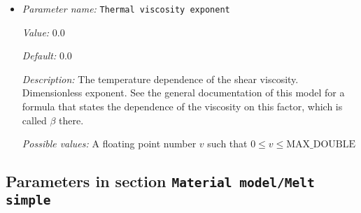 \begin{itemize}
{\it Value:} 2e-5


{\it Default:} 2e-5


{\it Description:} The value of the thermal expansion coefficient $\beta$. Units: $1/K$.


{\it Possible values:} A floating point number $v$ such that $0 \leq v \leq \text{MAX\_DOUBLE}$
\item {\it Parameter name:} {\tt Thermal viscosity exponent}
\label{parameters:Material model/Melt global/Thermal viscosity exponent}


{\it Value:} 0.0


{\it Default:} 0.0


{\it Description:} The temperature dependence of the shear viscosity. Dimensionless exponent. See the general documentation of this model for a formula that states the dependence of the viscosity on this factor, which is called $\beta$ there.


{\it Possible values:} A floating point number $v$ such that $0 \leq v \leq \text{MAX\_DOUBLE}$
\end{itemize}

\subsection{Parameters in section \tt Material model/Melt simple}
\label{parameters:Material_20model/Melt_20simple}

